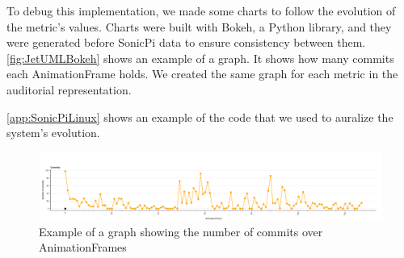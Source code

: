To debug this implementation, we made some charts to follow the evolution of the metric's values. Charts were built with Bokeh, a Python library, and they were generated before SonicPi data to ensure consistency between them. \autoref{fig:JetUMLBokeh} shows an example of a graph. It shows how many commits each AnimationFrame holds. We created the same graph for each metric in the auditorial representation. 

\autoref{app:SonicPiLinux} shows an example of the code that we used to auralize the system's evolution.

\begin{figure}
    \center
    \includegraphics[width=\textwidth]{JetUMLBokeh.png}
    \caption{Example of a graph showing the number of commits over AnimationFrames}
    \label{fig:JetUMLBokeh}
\end{figure}

